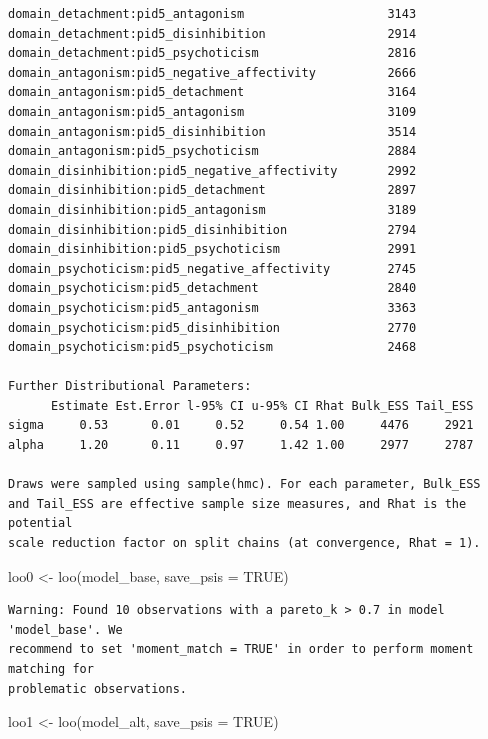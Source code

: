 \documentclass[
  11pt,
  a4paper,
  onecolumn]{article}
\newenvironment{Shaded}{}{}
\newcommand{\AttributeTok}[1]{\textcolor[rgb]{0.84,0.23,0.29}{#1}}
\newcommand{\ConstantTok}[1]{\textcolor[rgb]{0.00,0.36,0.77}{#1}}
\newcommand{\FunctionTok}[1]{\textcolor[rgb]{0.44,0.26,0.76}{#1}}
\newcommand{\NormalTok}[1]{\textcolor[rgb]{0.14,0.16,0.18}{#1}}
\newcommand{\OtherTok}[1]{\textcolor[rgb]{0.44,0.26,0.76}{#1}}
\begin{document}
\begin{verbatim}
domain_detachment:pid5_antagonism                    3143
domain_detachment:pid5_disinhibition                 2914
domain_detachment:pid5_psychoticism                  2816
domain_antagonism:pid5_negative_affectivity          2666
domain_antagonism:pid5_detachment                    3164
domain_antagonism:pid5_antagonism                    3109
domain_antagonism:pid5_disinhibition                 3514
domain_antagonism:pid5_psychoticism                  2884
domain_disinhibition:pid5_negative_affectivity       2992
domain_disinhibition:pid5_detachment                 2897
domain_disinhibition:pid5_antagonism                 3189
domain_disinhibition:pid5_disinhibition              2794
domain_disinhibition:pid5_psychoticism               2991
domain_psychoticism:pid5_negative_affectivity        2745
domain_psychoticism:pid5_detachment                  2840
domain_psychoticism:pid5_antagonism                  3363
domain_psychoticism:pid5_disinhibition               2770
domain_psychoticism:pid5_psychoticism                2468

Further Distributional Parameters:
      Estimate Est.Error l-95% CI u-95% CI Rhat Bulk_ESS Tail_ESS
sigma     0.53      0.01     0.52     0.54 1.00     4476     2921
alpha     1.20      0.11     0.97     1.42 1.00     2977     2787

Draws were sampled using sample(hmc). For each parameter, Bulk_ESS
and Tail_ESS are effective sample size measures, and Rhat is the potential
scale reduction factor on split chains (at convergence, Rhat = 1).
\end{verbatim}

\begin{Shaded}
\begin{Highlighting}[]
\NormalTok{loo0 }\OtherTok{\textless{}{-}} \FunctionTok{loo}\NormalTok{(model\_base, }\AttributeTok{save\_psis =} \ConstantTok{TRUE}\NormalTok{)}
\end{Highlighting}
\end{Shaded}

\begin{verbatim}
Warning: Found 10 observations with a pareto_k > 0.7 in model 'model_base'. We
recommend to set 'moment_match = TRUE' in order to perform moment matching for
problematic observations.
\end{verbatim}

\begin{Shaded}
\begin{Highlighting}[]
\NormalTok{loo1 }\OtherTok{\textless{}{-}} \FunctionTok{loo}\NormalTok{(model\_alt, }\AttributeTok{save\_psis =} \ConstantTok{TRUE}\NormalTok{)}
\end{Highlighting}
\end{Shaded}
\end{document}
